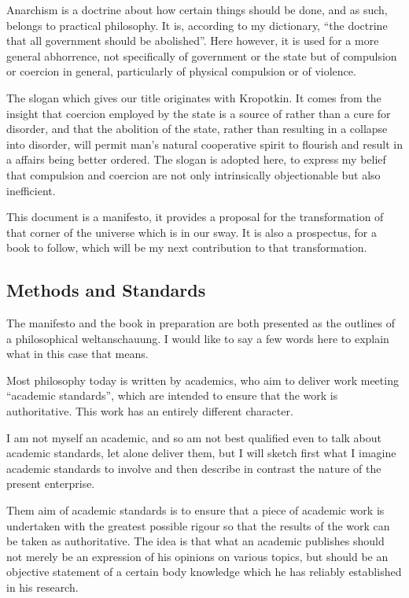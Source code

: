 Anarchism is a doctrine about how certain things should be done, and as such, belongs to practical philosophy.
It is, according to my dictionary, ``the doctrine that all government should be abolished''.
Here however, it is used for a more general abhorrence, not specifically of government or the state but of compulsion or coercion in general, particularly of physical compulsion or of violence.

The slogan which gives our title originates with Kropotkin.
It comes from the insight that coercion employed by the state is a source of rather than a cure for disorder, and that the abolition of the state, rather than resulting in a collapse into disorder, will permit man's natural cooperative spirit to flourish and result in a affairs being better ordered.
The slogan is adopted here, to express my belief that compulsion and coercion are not only intrinsically objectionable but also inefficient.

This document is a manifesto, it provides a proposal for the transformation of that corner of the universe which is in our sway.
It is also a prospectus, for a book to follow, which will be my next contribution to that transformation.

\subsection{Methods and Standards}

The manifesto and the book in preparation are both presented as the outlines of a philosophical weltanschauung.
I would like to say a few words here to explain what in this case that means.

Most philosophy today is written by academics, who aim to deliver work meeting ``academic standards'', which are intended to ensure that the work is authoritative.
This work has an entirely different character.

I am not myself an academic, and so am not best qualified even to talk about academic standards, let alone deliver them, but I will sketch first what I imagine academic standards to involve and then describe in contrast the nature of the present enterprise.

Them aim of academic standards is to ensure that a piece of academic work is undertaken with the greatest possible rigour so that the results of the work can be taken as authoritative.
The idea is that what an academic publishes should not merely be an expression of his opinions on various topics, but should be an objective statement of a certain body knowledge which he has reliably established in his research.

